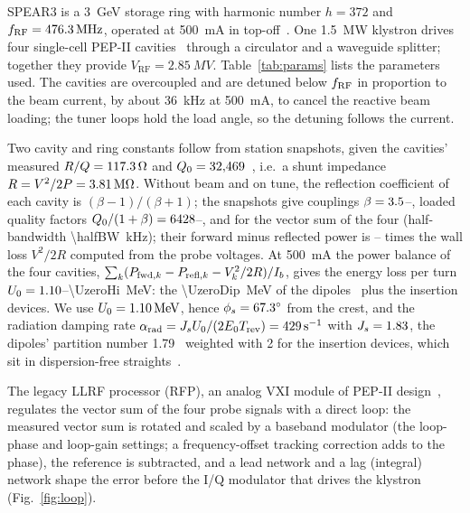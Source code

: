 SPEAR3 is a \SI{3}{GeV} storage ring with harmonic number $h=372$ and $f_\mathrm{RF}=\SI{476.3}{MHz}$, operated at \SI{500}{mA} in top-off~\cite{Hettel2002,McIntosh2004}. One \SI{1.5}{MW} klystron drives four single-cell PEP-II cavities~\cite{Rimmer1995,Rimmer2000} through a circulator and a waveguide splitter; together they provide $V_\mathrm{RF}=\SI{2.85}{MV}$. Table~\ref{tab:params} lists the parameters used. The cavities are overcoupled and are detuned below $f_\mathrm{RF}$ in proportion to the beam current, by about \SI{36}{kHz} at \SI{500}{mA}, to cancel the reactive beam loading; the tuner loops hold the load angle, so the detuning follows the current.

Two cavity and ring constants follow from station snapshots, given the cavities' measured $R/Q=\SI{117.3}{\ohm}$ and $Q_0=32{,}469$~\cite{Rimmer2000}, i.e.\ a shunt impedance $R=V^2/2P=\SI{3.81}{M\ohm}$. Without beam and on tune, the reflection coefficient of each cavity is $(\beta-1)/(\beta+1)$; the snapshots give couplings $\beta=3.5$--\betaHi, loaded quality factors $Q_0/(1+\beta)=6428$--\QLreflHi, and \QLrefl{} for the vector sum of the four (half-bandwidth \SI{\halfBW}{kHz}); their forward minus reflected power is \wallLo--\wallHi{} times the wall loss $V^2/2R$ computed from the probe voltages. At \SI{500}{mA} the power balance of the four cavities, $\sum_k(P_{\mathrm{fwd},k}-P_{\mathrm{refl},k}-V_k^2/2R)/I_b$, gives the energy loss per turn $U_0=1.10$--\SI{\UzeroHi}{MeV}: the \SI{\UzeroDip}{MeV} of the dipoles~\cite{Hettel2002} plus the insertion devices. We use $U_0=\SI{1.10}{MeV}$, hence $\phi_s=\ang{67.3}$ from the crest, and the radiation damping rate $\alpha_\mathrm{rad}=J_sU_0/(2E_0T_\mathrm{rev})=\SI{429}{s^{-1}}$ with $J_s=1.83$, the dipoles' partition number 1.79~\cite{Hettel2002} weighted with 2 for the insertion devices, which sit in dispersion-free straights~\cite{Sands1970}.

The legacy LLRF processor (RFP), an analog VXI module of PEP-II design~\cite{Corredoura1999}, regulates the vector sum of the four probe signals with a direct loop: the measured vector sum is rotated and scaled by a baseband modulator (the loop-phase and loop-gain settings; a frequency-offset tracking correction adds to the phase), the reference is subtracted, and a lead network and a lag (integral) network shape the error before the I/Q modulator that drives the klystron (Fig.~\ref{fig:loop}).

